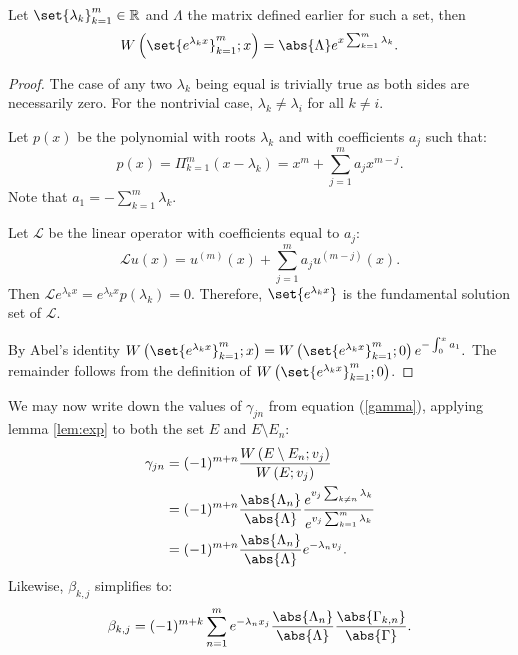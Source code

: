 \documentclass{article}
\begin{document}
\begin{lemma}
Let $\set{\lambda_k}_{k=1}^m \in \mathbb{R}$ and $\Lambda$ the matrix defined earlier for such a set, then
\begin{equation*}
\W{\set{e^{\lambda_k x}}_{k=1}^m}{x} = \abs{\Lambda}
e^{x \sum_{k=1}^m \lambda_k} .
\end{equation*}
\label{lem:exp}
\end{lemma}

\begin{proof}
The case of any two $\lambda_k$ being equal is trivially true as both sides are necessarily zero.
For the nontrivial case, $\lambda_k \neq \lambda_i$ for all $k \neq i$.

Let $p(x)$ be the polynomial with roots $\lambda_k$ and with coefficients $a_j$ such that:
\begin{equation*}
p(x) = \Pi_{k=1}^m \left (x - \lambda_k \right) = x^m + \sum_{j=1}^m a_j x^{m-j}.
\end{equation*}
Note that $a_1 = -\sum_{k=1}^m \lambda_k$.

Let $\mathcal{L}$ be the linear operator with coefficients equal to $a_j$:
$$
\mathcal{L} u(x) = u^{(m)}(x) + \sum_{j=1}^m a_j u^{(m-j)}(x).
$$
Then $\mathcal{L} e^{\lambda_k x} = e^{\lambda_k x} p(\lambda_k) = 0$.
Therefore, $\set{e^{\lambda_k x}}$ is the fundamental solution set of $\mathcal{L}$.

By Abel's identity $\W{\set{e^{\lambda_k x}}_{k=1}^m}{x} = \W{\set{e^{\lambda_k x}}_{k=1}^m}{0} e^{-\int_0^x a_1}.$
The remainder follows from the definition of $\W{\set{e^{\lambda_k x}}_{k=1}^m}{0}$.
\end{proof}

We may now write down the values of $\gamma_{jn}$ from equation (\ref{gamma}), applying lemma \ref{lem:exp} to both the set $E$ and $E \setminus E_n$:
\begin{equation*}
\begin{split}
\gamma_{jn} & = (-1)^{m+n} \frac{\W{E \setminus E_n}{v_j}}{\W{E}{v_j}} \\
			& = (-1)^{m+n} \frac{\abs{\Lambda_n}}{\abs{\Lambda}} \frac{e^{v_j \sum_{k \neq n} \lambda_k}}{e^{v_j \sum_{k=1}^m \lambda_k}} \\
			& = (-1)^{m+n} \frac{\abs{\Lambda_n}}{\abs{\Lambda}} e^{-\lambda_n v_j} .
\end{split}
\end{equation*}
Likewise, $\beta_{k,j}$ simplifies to:
\begin{equation*}
\beta_{k,j} = (-1)^{m+k} \sum_{n=1}^m e^{-\lambda_n x_j} \frac{\abs{\Lambda_n}}{\abs{\Lambda}} \frac{\abs{\Gamma_{k,n}}}{\abs{\Gamma}} .
\end{equation*}
\end{document}
